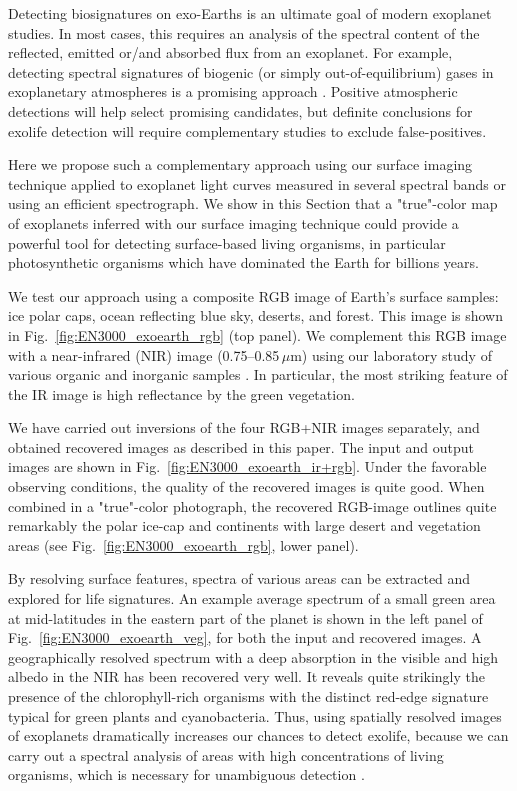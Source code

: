 \documentclass{emulateapj}
\begin{document}
Detecting biosignatures on exo-Earths is an ultimate goal of modern
exoplanet studies. In most cases, this requires an analysis of 
the spectral content of the reflected, emitted or/and absorbed flux
from an exoplanet. For example, detecting spectral 
signatures of biogenic (or simply out-of-equilibrium) gases in exoplanetary 
atmospheres is a promising approach \citep[e.g.,][]{gren2013}.
Positive atmospheric detections will help select promising candidates, 
but definite conclusions for exolife detection will require 
complementary studies to exclude false-positives.

Here we propose such a complementary approach using our surface imaging technique
applied to exoplanet light curves measured in several spectral bands
or using an efficient spectrograph.
We show in this Section that a "true"-color map of exoplanets
inferred with our surface imaging technique could  provide a powerful
tool for detecting surface-based living organisms,
in particular photosynthetic organisms which have dominated the Earth
for billions years.

We test our approach using a composite RGB image of Earth's surface samples:
ice polar caps, ocean reflecting blue sky, deserts, and forest. 
This image is shown in Fig.~\ref{fig:EN3000_exoearth_rgb} (top panel).
We complement this RGB image with a near-infrared (NIR) image (0.75--0.85\,$\mu$m) 
using our laboratory study of various organic and inorganic 
samples \citep{berdetal2016}. In particular, the most striking feature 
of the IR image is high reflectance by the green vegetation. 

We have carried out inversions of the four RGB+NIR images separately,
and obtained recovered images as described in this paper. The input and output
images are shown in Fig.~\ref{fig:EN3000_exoearth_ir+rgb}.
Under the favorable observing conditions, the quality of the recovered
images is quite good. When combined in a "true"-color photograph,
the recovered RGB-image outlines quite remarkably the polar ice-cap 
and continents with large desert and vegetation areas 
(see Fig.~\ref{fig:EN3000_exoearth_rgb}, lower panel).

By resolving surface features, spectra of various areas can be 
extracted and explored for life signatures. 
An example average spectrum
of a small green area at mid-latitudes in the eastern part of the planet
is shown in the left panel of Fig.~\ref{fig:EN3000_exoearth_veg},
for both the input and recovered images. A geographically resolved spectrum  
with a deep absorption in the visible and high albedo in the NIR 
has been recovered very well. 
It reveals quite strikingly the presence of the
chlorophyll-rich organisms with the distinct red-edge signature typical for
green plants and cyanobacteria. Thus, using spatially resolved images 
of exoplanets dramatically increases our chances to detect exolife, because
we can carry out a spectral analysis of areas with high concentrations of
living organisms, which is necessary for 
unambiguous detection 
\citep[see models with various biopigments in][]{berdetal2016}. 
\end{document}
